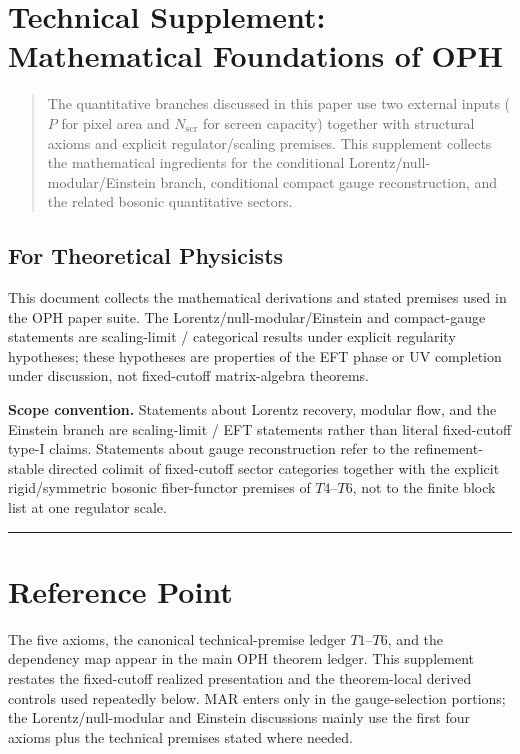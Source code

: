 \section{Technical Supplement: Mathematical Foundations of OPH}\label{technical-supplement-mathematical-foundations-of-observer-patch-holography}

\begin{quote}
The quantitative branches discussed in this paper use two external inputs (\(P\) for pixel area and \(N_{\mathrm{scr}}\) for screen capacity) together with structural axioms and explicit regulator/scaling premises. This supplement collects the mathematical ingredients for the conditional Lorentz/null-modular/Einstein branch, conditional compact gauge reconstruction, and the related bosonic quantitative sectors.
\end{quote}

\subsection{For Theoretical Physicists}\label{for-theoretical-physicists}

This document collects the mathematical derivations and stated premises used in the OPH paper suite. The Lorentz/null-modular/Einstein and compact-gauge statements are scaling-limit / categorical results under explicit regularity hypotheses; these hypotheses are properties of the EFT phase or UV completion under discussion, not fixed-cutoff matrix-algebra theorems.

\textbf{Scope convention.} Statements about Lorentz recovery, modular flow, and the Einstein branch are scaling-limit / EFT statements rather than literal fixed-cutoff type-I claims. Statements about gauge reconstruction refer to the refinement-stable directed colimit of fixed-cutoff sector categories together with the explicit rigid/symmetric bosonic fiber-functor premises of \(T4\)--\(T6\), not to the finite block list at one regulator scale.

\begin{center}\rule{0.5\linewidth}{0.5pt}\end{center}

\section{Reference Point}\label{1-core-axioms-and-definitions}

The five axioms, the canonical technical-premise ledger \(T1\)--\(T6\), and the dependency map appear in the main OPH theorem ledger. This supplement restates the fixed-cutoff realized presentation and the theorem-local derived controls used repeatedly below. MAR enters only in the gauge-selection portions; the Lorentz/null-modular and Einstein discussions mainly use the first four axioms plus the technical premises stated where needed.

